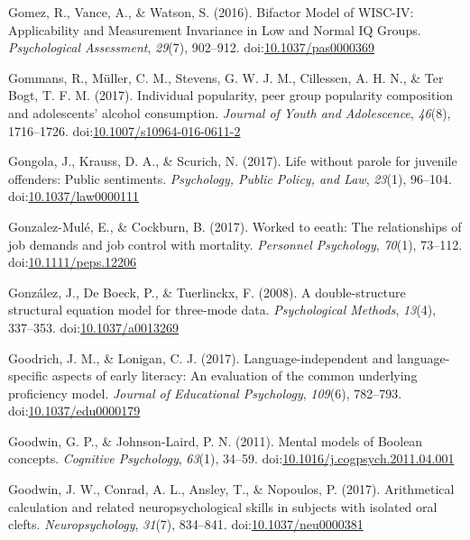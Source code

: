 \documentclass[english,man]{apa6}
\theoremstyle{definition}
\theoremstyle{definition}
\theoremstyle{definition}
\theoremstyle{remark}
\begin{document}
\hypertarget{ref-Gomez2017a}{}
Gomez, R., Vance, A., \& Watson, S. (2016). Bifactor Model of WISC-IV:
Applicability and Measurement Invariance in Low and Normal IQ Groups.
\emph{Psychological Assessment}, \emph{29}(7), 902--912.
doi:\href{https://doi.org/10.1037/pas0000369}{10.1037/pas0000369}

\hypertarget{ref-Gommans2017}{}
Gommans, R., Müller, C. M., Stevens, G. W. J. M., Cillessen, A. H. N.,
\& Ter Bogt, T. F. M. (2017). Individual popularity, peer group
popularity composition and adolescents' alcohol consumption.
\emph{Journal of Youth and Adolescence}, \emph{46}(8), 1716--1726.
doi:\href{https://doi.org/10.1007/s10964-016-0611-2}{10.1007/s10964-016-0611-2}

\hypertarget{ref-Gongola2017}{}
Gongola, J., Krauss, D. A., \& Scurich, N. (2017). Life without parole
for juvenile offenders: Public sentiments. \emph{Psychology, Public
Policy, and Law}, \emph{23}(1), 96--104.
doi:\href{https://doi.org/10.1037/law0000111}{10.1037/law0000111}

\hypertarget{ref-Gonzalez-Mule2017}{}
Gonzalez-Mulé, E., \& Cockburn, B. (2017). Worked to eeath: The
relationships of job demands and job control with mortality.
\emph{Personnel Psychology}, \emph{70}(1), 73--112.
doi:\href{https://doi.org/10.1111/peps.12206}{10.1111/peps.12206}

\hypertarget{ref-Gonzalez2008}{}
González, J., De Boeck, P., \& Tuerlinckx, F. (2008). A double-structure
structural equation model for three-mode data. \emph{Psychological
Methods}, \emph{13}(4), 337--353.
doi:\href{https://doi.org/10.1037/a0013269}{10.1037/a0013269}

\hypertarget{ref-Goodrich2017}{}
Goodrich, J. M., \& Lonigan, C. J. (2017). Language-independent and
language-specific aspects of early literacy: An evaluation of the common
underlying proficiency model. \emph{Journal of Educational Psychology},
\emph{109}(6), 782--793.
doi:\href{https://doi.org/10.1037/edu0000179}{10.1037/edu0000179}

\hypertarget{ref-Goodwin2011}{}
Goodwin, G. P., \& Johnson-Laird, P. N. (2011). Mental models of Boolean
concepts. \emph{Cognitive Psychology}, \emph{63}(1), 34--59.
doi:\href{https://doi.org/10.1016/j.cogpsych.2011.04.001}{10.1016/j.cogpsych.2011.04.001}

\hypertarget{ref-Goodwin2017}{}
Goodwin, J. W., Conrad, A. L., Ansley, T., \& Nopoulos, P. (2017).
Arithmetical calculation and related neuropsychological skills in
subjects with isolated oral clefts. \emph{Neuropsychology},
\emph{31}(7), 834--841.
doi:\href{https://doi.org/10.1037/neu0000381}{10.1037/neu0000381}
\end{document}
